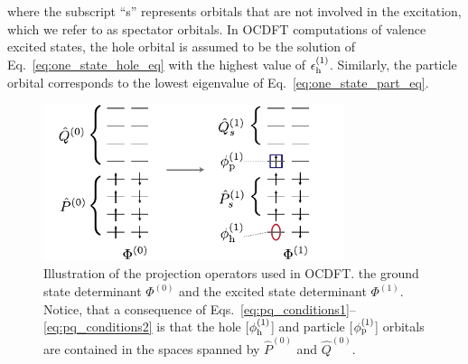 \documentclass[12pt]{article}
\begin{document}
where the subscript ``s'' represents orbitals that are not involved in the excitation, which we refer to as spectator orbitals.
In OCDFT computations of valence excited states, the hole orbital is assumed to be the solution of Eq.~\eqref{eq:one_state_hole_eq} with the highest value of $\epsilon^{(1)}_{\rm h}$.  Similarly, the particle orbital corresponds to the lowest eigenvalue of Eq.~\eqref{eq:one_state_part_eq}.
\begin{figure}
\centering
\includegraphics[width=8.8cm]{Figure1.pdf}
\caption{Illustration of the projection operators used in OCDFT.   the ground state determinant $\Phi^{(0)}$ and the excited state determinant $\Phi^{(1)}$. Notice, that a consequence of Eqs.~\eqref{eq:pq_conditions1}--\eqref{eq:pq_conditions2} is that the hole [$\phi^{(1)}_{\rm h}$] and particle [$\phi^{(1)}_{\rm p}$] orbitals are contained in the spaces spanned by $\hat{P}^{(0)}$ and $\hat{Q}^{(0)}$.}
\label{fig:projection}
\end{figure}
\end{document}
